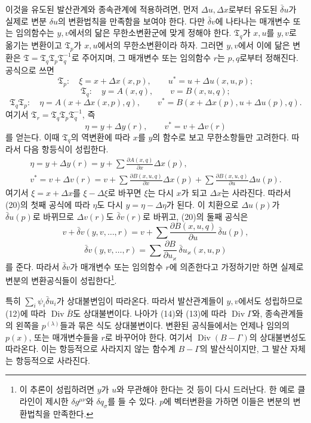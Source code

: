 이것을 유도된 발산관계와 종속관계에 적용하려면, 먼저 \(\Delta u,\Delta x\)로부터 유도된 \(\bar\delta u\)가 실제로 변분 \(\delta u\)의 변환법칙을 만족함을 보여야 한다. 다만 \(\bar\delta v\)에 나타나는 매개변수 또는 임의함수는 \(y,v\)에서의 닮은 무한소변환군에 맞게 정해야 한다. \(\mathfrak T_q\)가 \(x,u\)를 \(y,v\)로 옮기는 변환이고 \(\mathfrak T_p\)가 \(x,u\)에서의 무한소변환이라 하자. 그러면 \(y,v\)에서 이에 닮은 변환은 \(\mathfrak T=\mathfrak T_q\mathfrak T_p\mathfrak T_q^{-1}\)로 주어지며, 그 매개변수 또는 임의함수 \(r\)는 \(p,q\)로부터 정해진다. 공식으로 쓰면
\[
\mathfrak T_p:\quad
\xi=x+\Delta x(x,p),\qquad
u^*=u+\Delta u(x,u,p);
\]
\[
\mathfrak T_q:\quad
y=A(x,q),\qquad v=B(x,u,q);
\]
\[
\mathfrak T_q\mathfrak T_p:\quad
\eta=A(x+\Delta x(x,p),q),\qquad
v^*=B(x+\Delta x(p),u+\Delta u(p),q).
\]
여기서 \(\mathfrak T_r=\mathfrak T_q\mathfrak T_p\mathfrak T_q^{-1}\), 즉
\[
\eta=y+\Delta y(r),\qquad v^*=v+\Delta v(r)
\]
를 얻는다. 이때 \(\mathfrak T_q\)의 역변환에 따라 \(x\)를 \(y\)의 함수로 보고 무한소항들만 고려한다. 따라서 다음 항등식이 성립한다.
\begin{equation}
\tag{20}
\begin{gathered}
\eta=y+\Delta y(r)
=y+\sum\frac{\partial A(x,q)}{\partial x}\Delta x(p),\\[0.55em]
v^*=v+\Delta v(r)
=v+\sum\frac{\partial B(x,u,q)}{\partial x}\Delta x(p)
+\sum\frac{\partial B(x,u,q)}{\partial u}\Delta u(p).
\end{gathered}
\end{equation}
여기서 \(\xi=x+\Delta x\)를 \(\xi-\Delta\xi\)로 바꾸면 \(\xi\)는 다시 \(x\)가 되고 \(\Delta x\)는 사라진다. 따라서 (20)의 첫째 공식에 따라 \(\eta\)도 다시 \(y=\eta-\Delta\eta\)가 된다. 이 치환으로 \(\Delta u(p)\)가 \(\bar\delta u(p)\)로 바뀌므로 \(\Delta v(r)\)도 \(\bar\delta v(r)\)로 바뀌고, (20)의 둘째 공식은
\[
v+\bar\delta v(y,v,\ldots,r)
=v+\sum\frac{\partial B(x,u,q)}{\partial u}\,\bar\delta u(p),
\]
\[
\bar\delta v(y,v,\ldots,r)
=\sum\frac{\partial B}{\partial u_\varkappa}
\,\bar\delta u_\varkappa(x,u,p)
\]
를 준다. 따라서 \(\bar\delta v\)가 매개변수 또는 임의함수 \(r\)에 의존한다고 가정하기만 하면 실제로 변분의 변환공식들이 성립한다\footnote{이 추론이 성립하려면 \(y\)가 \(u\)와 무관해야 한다는 것 등이 다시 드러난다. 한 예로 클라인이 제시한 \(\delta g^{\mu\nu}\)와 \(\delta q_\sigma\)를 들 수 있다. \(p\)에 벡터변환을 가하면 이들은 변분의 변환법칙을 만족한다.}.

특히 \(\sum_i\psi_i\bar\delta u_i\)가 상대불변임이 따라온다. 따라서 발산관계들이 \(y,v\)에서도 성립하므로 (12)에 따라 \(\operatorname{Div}\bar B\)도 상대불변이다. 나아가 (14)와 (13)에 따라 \(\operatorname{Div}\Gamma\)와, 종속관계들의 왼쪽을 \(p^{(\lambda)}\)들과 묶은 식도 상대불변이다. 변환된 공식들에서는 언제나 임의의 \(p(x)\), 또는 매개변수들을 \(r\)로 바꾸어야 한다. 여기서 \(\operatorname{Div}(B-\Gamma)\)의 상대불변성도 따라온다. 이는 항등적으로 사라지지 않는 함수계 \(B-\Gamma\)의 발산식이지만, 그 발산 자체는 항등적으로 사라진다.

